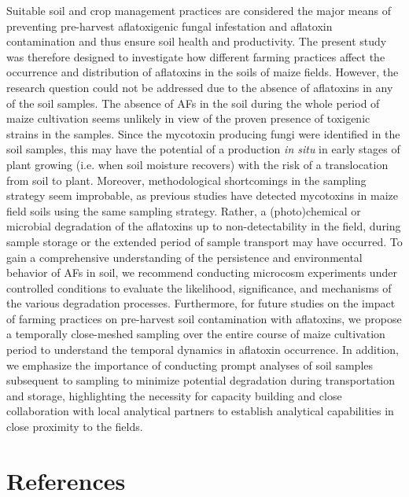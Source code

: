 \begin{refsection}
Suitable soil and crop management practices are considered the major means of preventing pre-harvest aflatoxigenic fungal infestation and aflatoxin contamination and thus ensure soil health and productivity. The present study was therefore designed to investigate how different farming practices affect the occurrence and distribution of aflatoxins in the soils of maize fields. However, the research question could not be addressed due to the absence of aflatoxins in any of the soil samples. The absence of AFs in the soil during the whole period of maize cultivation seems unlikely in view of the proven presence of toxigenic strains in the samples. Since the mycotoxin producing fungi were identified in the soil samples, this may have the potential of a production \textit{in situ} in early stages of plant growing (i.e. when soil moisture recovers) with the risk of a translocation from soil to plant. Moreover, methodological shortcomings in the sampling strategy seem improbable, as previous studies have detected mycotoxins in maize field soils using the same sampling strategy. Rather, a (photo)chemical or microbial degradation of the aflatoxins up to non-detectability in the field, during sample storage or the extended period of sample transport may have occurred. To gain a comprehensive understanding of the persistence and environmental behavior of AFs in soil, we recommend conducting microcosm experiments under controlled conditions to evaluate the likelihood, significance, and mechanisms of the various degradation processes. Furthermore, for future studies on the impact of farming practices on pre-harvest soil contamination with aflatoxins, we propose a temporally close-meshed sampling over the entire course of maize cultivation period to understand the temporal dynamics in aflatoxin occurrence. In addition, we emphasize the importance of conducting prompt analyses of soil samples subsequent to sampling to minimize potential degradation during transportation and storage, highlighting the necessity for capacity building and close collaboration with local analytical partners to establish analytical capabilities in close proximity to the fields.

\section{References}

\printbibliography[segment=\therefsegment, heading=none]

\end{refsection}
